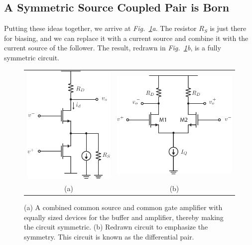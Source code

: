 \subsection{A Symmetric Source Coupled Pair is Born}
Putting these ideas together, we arrive at \emph{Fig.~\ref{fig:amp_CS_CG_sym}a}.  The resistor $R_S$ is just there for biasing, and we can replace it with a current source and combine it with the current source of the follower.  The result, redrawn in \emph{Fig.~\ref{fig:amp_CS_CG_sym}b}, is a fully symmetric circuit.
\begin{figure}[H]
\centering
\begin{tabular}{cc}
\includegraphics[scale=1.2]{amp_CS_CG_sym} &
\includegraphics[scale=1.2]{amp_sym_pair}\\
(a) & (b)\\
\end{tabular}
\caption{(a) A combined common source and common gate amplifier with equally sized devices for the buffer and amplifier, thereby making the circuit symmetric.  (b) Redrawn circuit to emphasize the symmetry.  This circuit is known as the differential pair.}
\label{fig:amp_CS_CG_sym}
\end{figure}
